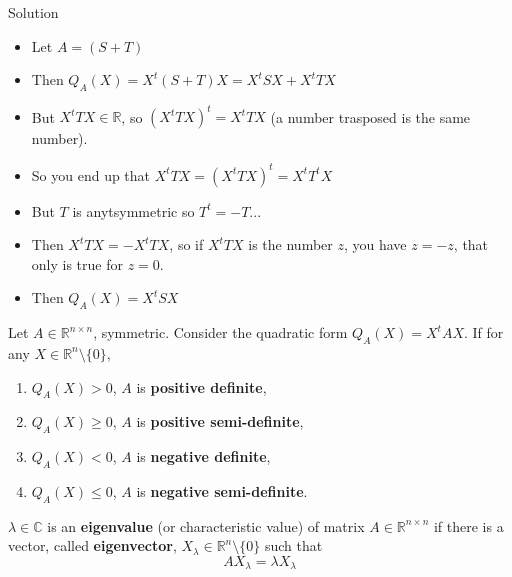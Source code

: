 \documentclass[aspectratio=169]{beamer}
\begin{document}
\begin{frame}{Solution}
    
    \begin{itemize}
        \item Let $A = (S+T)$
        \item Then $Q_A(X) = X^t(S+T)X = X^tSX + X^tTX$
        \item But $X^tTX\in \mathds{R}$, so $(X^tTX)^t=X^tTX$ (a number trasposed is the same number).
        \item So you end up that $X^tTX = (X^tTX)^t = X^tT^tX$
        \item But $T$ is anytsymmetric so $T^t = -T$...
        \item Then $X^tTX = -X^tTX$, so if $X^tTX$ is the number $z$, you have $z=-z$, that only is true for $z=0$.
        \item Then $Q_A(X) = X^tSX$
    \end{itemize}
    
\end{frame}

\begin{frame}
    \begin{definition}
        Let $A\in\mathds{R}^{n\times n}$, symmetric. Consider the quadratic form $Q_A(X)=X^t A X$. If for any $X\in\mathds{R}^n\setminus\{0\}$,
        \begin{enumerate}
            \item $Q_A(X)>0$, $A$ is \textbf{positive definite}, \item $Q_A(X)\geq0$, $A$ is \textbf{positive semi-definite}, \item $Q_A(X)<0$, $A$ is \textbf{negative definite}, \item $Q_A(X)\leq0$, $A$ is \textbf{negative semi-definite}.
        \end{enumerate}
    \end{definition}
\end{frame}

\begin{frame}
    \begin{definition}
        $\lambda\in\mathds{C}$ is an \textbf{eigenvalue} (or characteristic value) of matrix $A\in\mathds{R}^{n\times n}$ if there is a vector, called \textbf{eigenvector}, $X_\lambda\in\mathds{R}^n\setminus\{0\}$ such that $$A X_\lambda = \lambda X_\lambda$$
    \end{definition}
    
\end{frame}
\end{document}
